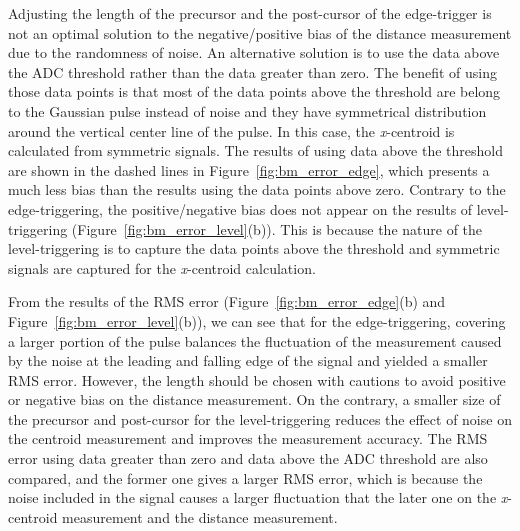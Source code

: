 Adjusting the length of the precursor and the post-cursor of the edge-trigger is not an optimal solution to the negative/positive bias of the distance measurement due to the randomness of noise. An alternative solution is to use the data above the ADC threshold rather than the data greater than zero. The benefit of using those data points is that most of the data points above the threshold are belong to the Gaussian pulse instead of noise and they have symmetrical distribution around the vertical center line of the pulse. In this case, the \textit{x}-centroid is calculated from symmetric signals. The results of using data above the threshold are shown in the dashed lines in Figure~\ref{fig:bm_error_edge}, which presents a much less bias than the results using the data points above zero. Contrary to the edge-triggering, the positive/negative bias does not appear on the results of level-triggering (Figure~\ref{fig:bm_error_level}(b)). This is because the nature of the level-triggering is to capture the data points above the threshold and symmetric signals are captured for the \textit{x}-centroid calculation.\par
From the results of the RMS error (Figure~\ref{fig:bm_error_edge}(b) and Figure~\ref{fig:bm_error_level}(b)), we can see that for the edge-triggering, covering a larger portion of the pulse balances the fluctuation of the measurement caused by the noise at the leading and falling edge of the signal and yielded a smaller RMS error. However, the length should be chosen with cautions to avoid positive or negative bias on the distance measurement. On the contrary, a smaller size of the precursor and post-cursor for the level-triggering reduces the effect of noise on the centroid measurement and improves the measurement accuracy. The RMS error using data greater than zero and data above the ADC threshold are also compared, and the former one gives a larger RMS error, which is because the noise included in the signal causes a larger fluctuation that the later one on the \textit{x}-centroid measurement and the distance measurement.






